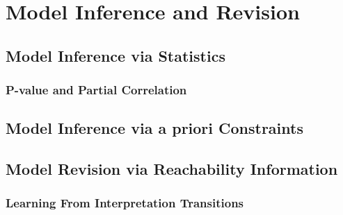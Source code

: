 \chapter{Model Inference and Revision}
\section{Model Inference via Statistics}
\subsection{P-value and Partial Correlation}
\section{Model Inference via a priori Constraints}
\section{Model Revision via Reachability Information}
\subsection{Learning From Interpretation Transitions}